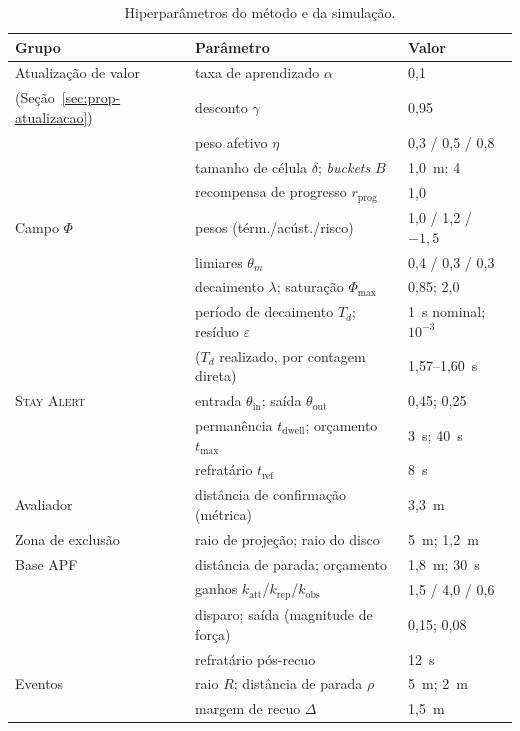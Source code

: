 \begin{table}[htb]
\centering
\caption{Hiperparâmetros do método e da simulação.}
\label{tab:setup-hiper}
\footnotesize
\begin{tabular}{lll}
\hline
\textbf{Grupo} & \textbf{Parâmetro} & \textbf{Valor}\\
\hline
Atualização de valor & taxa de aprendizado $\alpha$ & 0,1\\
(Seção~\ref{sec:prop-atualizacao}) & desconto $\gamma$ & 0,95\\
          & peso afetivo $\eta$ & 0,3 / 0,5 / 0,8\\
          & tamanho de célula $\delta$; \textit{buckets} $B$ & 1,0~m; 4\\
          & recompensa de progresso $r_{\text{prog}}$ & 1,0\\
Campo $\Phi$ & pesos (térm./acúst./risco) & 1,0 / 1,2 / $-1{,}5$\\
          & limiares $\theta_m$ & 0,4 / 0,3 / 0,3\\
          & decaimento $\lambda$; saturação $\Phi_{\max}$ & 0,85; 2,0\\
          & período de decaimento $T_d$; resíduo $\varepsilon$ & 1~s nominal; $10^{-3}$\\
          & \quad($T_d$ realizado, por contagem direta) & 1,57--1,60~s\\
\textsc{Stay Alert} & entrada $\theta_{\text{in}}$; saída $\theta_{\text{out}}$ & 0,45; 0,25\\
          & permanência $t_{\text{dwell}}$; orçamento $t_{\max}$ & 3~s; 40~s\\
          & refratário $t_{\text{ref}}$ & 8~s\\
Avaliador & distância de confirmação (métrica) & 3,3~m\\
Zona de exclusão & raio de projeção; raio do disco & 5~m; 1,2~m\\
Base APF  & distância de parada; orçamento & 1,8~m; 30~s\\
          & ganhos $k_{\text{att}}$/$k_{\text{rep}}$/$k_{\text{obs}}$ & 1,5 / 4,0 / 0,6\\
          & disparo; saída (magnitude de força) & 0,15; 0,08\\
          & refratário pós-recuo & 12~s\\
Eventos   & raio $R$; distância de parada $\rho$ & 5~m; 2~m\\
          & margem de recuo $\Delta$ & 1,5~m\\
\hline
\end{tabular}
\end{table}

